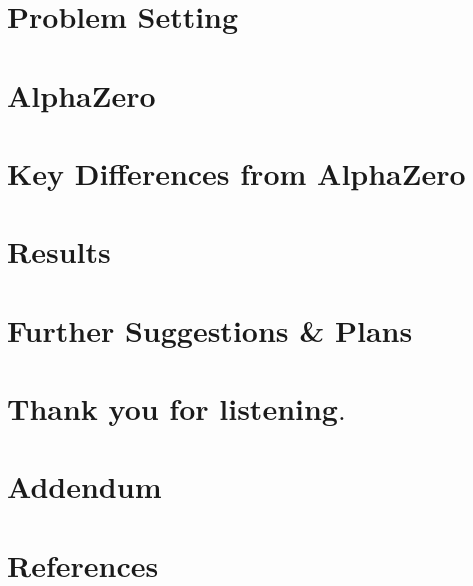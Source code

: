 \documentclass[10pt]{beamer}
\begin{document}
\begin{frame}[plain]
  \maketitle
\end{frame}

\section{Problem Setting}


\section{AlphaZero}


\section{Key Differences from AlphaZero}


\section{Results}


\section{Further Suggestions \& Plans}


\section{Thank you for listening$.$}

\section{Addendum}


\section{References}

\end{document}
